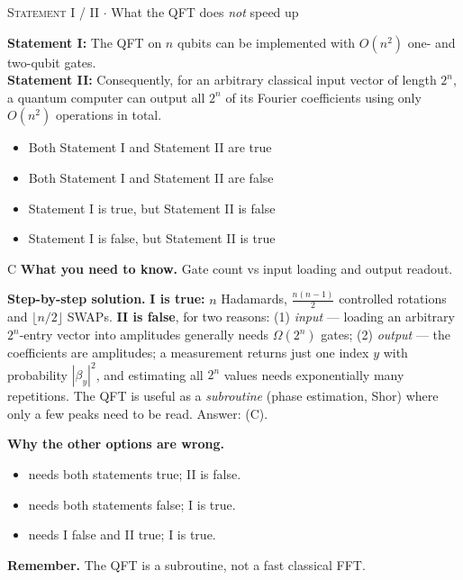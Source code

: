 \documentclass[11pt,a4paper]{article}
\newcommand{\optlabel}[1]{\textbf{(#1)}}
\newcommand{\correctlabel}[1]{\textcolor{okgreen}{\textbf{(#1)}\,\ding{51}}}
\newenvironment{qitem}[1]{\begin{list}{}{\setlength{\leftmargin}{3.3em}\setlength{\labelwidth}{3.1em}%
  \setlength{\labelsep}{0.2em}\setlength{\topsep}{3pt}\setlength{\parsep}{3pt}}\item[\textbf{Q.#1}\hfill]}{\end{list}}
\newcommand{\qsep}{\par\vspace{2pt}{\color{black!15}\hrule}\vspace{4pt}}
\newcommand{\qmeta}[2]{{\footnotesize\color{black!60}\textsc{#1} \;$\cdot$\; #2}\par}
\begin{document}
\begin{qitem}{58}
\qmeta{Statement I / II}{What the QFT does \emph{not} speed up}
\textbf{Statement I:} The QFT on $n$ qubits can be implemented with $O(n^2)$ one- and two-qubit gates.\\[1mm]
\textbf{Statement II:} Consequently, for an arbitrary classical input vector of length $2^n$, a quantum computer can output all
$2^n$ of its Fourier coefficients using only $O(n^2)$ operations in total.
\begin{itemize}[leftmargin=2.6em, labelsep=0.4em, itemsep=2pt, topsep=3pt]
\item[\optlabel{A}] Both Statement I and Statement II are true
\item[\optlabel{B}] Both Statement I and Statement II are false
\item[\correctlabel{C}] Statement I is true, but Statement II is false
\item[\optlabel{D}] Statement I is false, but Statement II is true
\end{itemize}
\end{qitem}
\begin{solbox}{C}
\textbf{\color{brand}What you need to know.} Gate count vs input loading and output readout.

\textbf{\color{brand}Step-by-step solution.} \textbf{I is true:} $n$ Hadamards, $\frac{n(n-1)}{2}$ controlled rotations and $\lfloor n/2\rfloor$ SWAPs.
\textbf{II is false}, for two reasons: (1) \emph{input} --- loading an arbitrary $2^n$-entry vector into amplitudes
generally needs $\Omega(2^n)$ gates; (2) \emph{output} --- the coefficients are amplitudes; a measurement returns just one
index $y$ with probability $|\beta_y|^2$, and estimating all $2^n$ values needs exponentially many repetitions.
The QFT is useful as a \emph{subroutine} (phase estimation, Shor) where only a few peaks need to be read. Answer: (C).

\textbf{\color{brand}Why the other options are wrong.}
\begin{itemize}[leftmargin=2.4em, itemsep=1pt, topsep=2pt]
\item[\textbf{(A)}] needs both statements true; II is false.
\item[\textbf{(B)}] needs both statements false; I is true.
\item[\textbf{(D)}] needs I false and II true; I is true.
\end{itemize}
\textbf{\color{brand}Remember.} The QFT is a subroutine, not a fast classical FFT.
\end{solbox}
\qsep
\end{document}
